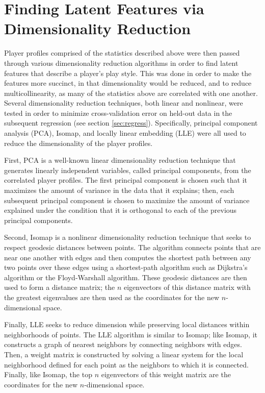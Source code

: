 \section{Finding Latent Features via Dimensionality Reduction}
\label{sec:dim_red}

Player profiles comprised of the statistics described above were then passed through
various dimensionality reduction algorithms in order to find latent features that
describe a player's play style. This was done in order to make the features more
succinct, in that dimensionality would be reduced, and to reduce multicollinearity,
as many of the statistics above are correlated with one another. Several
dimensionality reduction techniques, both linear and nonlinear, were tested in order
to minimize cross-validation error on held-out data in the subsequent regression
(see section \ref{sec:regress}). Specifically, principal component analysis (PCA),
Isomap, and locally linear embedding (LLE) were all used to reduce the
dimensionality of the player profiles.

First, PCA is a well-known linear dimensionality reduction technique that generates
linearly independent variables, called principal components, from the correlated
player profiles. The first principal component is chosen such that it maximizes the
amount of variance in the data that it explains; then, each subsequent principal
component is chosen to maximize the amount of variance explained under the condition
that it is orthogonal to each of the previous principal components.

Second, Isomap is a nonlinear dimensionality reduction technique that seeks to
respect geodesic distances between points. The algorithm connects points that are
near one another with edges and then computes the shortest path between any two
points over these edges using a shortest-path algorithm such as Dijkstra's algorithm
or the Floyd-Warshall algorithm. These geodesic distances are then used to form a
distance matrix; the $n$ eigenvectors of this distance matrix with the greatest
eigenvalues are then used as the coordinates for the new $n$-dimensional space.

Finally, LLE seeks to reduce dimension while preserving local distances within
neighborhoods of points. The LLE algorithm is similar to Isomap; like Isomap, it
constructs a graph of nearest neighbors by connecting neighbors with edges. Then, a
weight matrix is constructed by solving a linear system for the local neighborhood
defined for each point as the neighbors to which it is connected. Finally, like
Isomap, the top $n$ eigenvectors of this weight matrix are the coordinates for the
new $n$-dimensional space.

